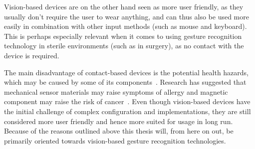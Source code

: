 Vision-based devices are on the other hand seen as more user friendly, as they usually don't require the user to wear anything, and can thus also be used more easily
in combination with other input methods (such as mouse and keyboard). This is perhaps especially relevant when it comes to using gesture recognition technology in
sterile environments (such as in surgery), as no contact with the device is required. 

The main disadvantage of contact-based devices is the potential health hazards, which may be caused by some of its components~\citep{Schultz2003}. 
Research has suggested that mechanical sensor materials may raise symptoms of allergy and magnetic component may raise the risk of cancer~\citep{Nishikawa2003}. 
Even though vision-based devices have the initial challenge of complex configuration and implementations, 
they are still considered more user friendly and hence more suited for usage in long run. Because of the reasons outlined above this thesis will, from here on out, be
primarily oriented towards vision-based gesture recognition technologies. 

